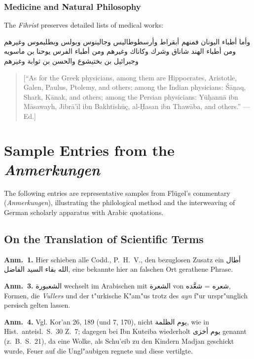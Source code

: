 \documentclass[11pt,a4paper]{article}
\newcommand{\ar}[1]{{\arabicfont\beginR #1\endR}}
\newenvironment{german}{\germanfont}{}
\newenvironment{editorialnote}{%
  \begin{quote}
  \small\itshape\color{notecolor}
}{%
  \end{quote}
}
\newenvironment{arabicblock}{%
  \par\vspace{0.5em}%
  \begin{center}%
  \begin{minipage}{0.9\textwidth}%
  \setlength{\parskip}{0pt}%
  \setlength{\parindent}{0pt}%
}{%
  \end{minipage}%
  \end{center}%
  \vspace{0.5em}%
}
\begin{document}
\subsubsection{Medicine and Natural Philosophy}

The \textit{Fihrist} preserves detailed lists of medical works:

\begin{arabicblock}
\ar{وأما أطباء اليونان فمنهم أبقراط وأرسطوطاليس وجالينوس}
\ar{وبولس وبطليموس وغيرهم ومن أطباء الهند شاناق وشرك}
\ar{وكاناك وغيرهم ومن أطباء الفرس يوحنا بن ماسويه}
\ar{وجبرائيل بن بختیشوع والحسن بن ثوابة وغيرهم}
\end{arabicblock}

\begin{editorialnote}
[``As for the Greek physicians, among them are Hippocrates, Aristotle,
Galen, Paulus, Ptolemy, and others; among the Indian physicians:
\'S\=a\d{n}aq, Shark, K\=anak, and others; among the Persian physicians: Y\=u\d{h}ann\=a
ibn M\=asawayh, Jibr\=a'\=il ibn Bakht\=ish\=u\c{c}, al-\d{H}asan ibn Thaw\=aba, and
others.'' --- Ed.]
\end{editorialnote}

\newpage

\section{Sample Entries from the \textit{Anmerkungen}}

The following entries are representative samples from Fl\"ugel's
commentary (\textit{Anmerkungen}), illustrating the philological method
and the interweaving of German scholarly apparatus with Arabic
quotations.

\subsection{On the Translation of Scientific Terms}

\begin{german}

\textbf{Anm.~1.} Hier schieben alle Codd., P.~H.~V., den bezuglosen
Zusatz ein \ar{أطال الله بقاء السيد الفاضل}, eine bekannte hier
an falschen Ort gerathene Phrase.

\smallskip

\textbf{Anm.~3.} \ar{الشعبورة} wechselt im Arabischen mit
\ar{الشعرة} von \ar{شعره} = \ar{شعَّده}, Formen, die
\textit{Vullers} und der t"urkische K"am"us trotz des \textit{ayn} f"ur
urspr"unglich persisch gelten lassen.

\smallskip

\textbf{Anm.~4.} Vgl. Kor'an 26, 189 (und 7, 170), nicht
\ar{يوم الظلمة}, wie in Hist.\ anteisl.\ S.~30 Z.~7; dagegen bei
Ibn Kuteiba wiederholt \ar{يوم أخزى} genannt (z.~B.\ S.~21), da eine
Wolke, als Schu'eib zu den Kindern Madjan geschickt wurde, Feuer auf
die Ungl"aubigen regnete und diese vertilgte.

\end{german}
\end{document}
